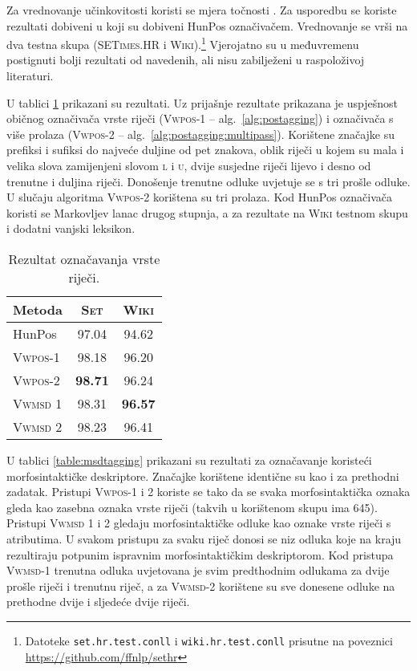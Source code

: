 Za vrednovanje učinkovitosti koristi se mjera točnosti . Za
usporedbu se koriste rezultati dobiveni u \citep{agic2013lemmatization} koji su
dobiveni HunPos označivačem. Vrednovanje se vrši na dva testna skupa
(\textsc{SETimes.HR} i \textsc{Wiki}).\footnote{Datoteke
\texttt{set.hr.test.conll} i \texttt{wiki.hr.test.conll} prisutne na poveznici
\url{https://github.com/ffnlp/sethr}} Vjerojatno su u međuvremenu postignuti
bolji rezultati od navedenih, ali nisu zabilježeni u raspoloživoj literaturi.

U tablici \ref{table:postagging} prikazani su rezultati. Uz prijašnje rezultate
prikazana je uspješnost običnog označivača vrste riječi (\textsc{Vwpos-1} --
alg.~\ref{alg:postagging}) i označivača s više prolaza (\textsc{Vwpos-2} --
alg.~\ref{alg:postagging:multipass}). Korištene značajke su prefiksi i sufiksi
do najveće duljine od pet znakova, oblik riječi u kojem su mala i velika slova
zamijenjeni slovom \textsc{l} i \textsc{u}, dvije susjedne riječi lijevo i desno
od trenutne i duljina riječi. Donošenje trenutne odluke uvjetuje se s tri prošle
odluke. U slučaju algoritma \textsc{Vwpos-2} korištena su tri prolaza. Kod HunPos
označivača koristi se Markovljev lanac drugog stupnja, a za rezultate na
\textsc{Wiki} testnom skupu i dodatni vanjski leksikon.

\begin{table}
\centering
\caption[Rezultat označavanja vrste riječi.]{Rezultat označavanja vrste riječi.}
\label{table:postagging}
\begin{tabular}{|l|c|c|}
\hline
Metoda             & \textsc{Set}   & \textsc{Wiki}  \\ \hline \hline
HunPos             & 97.04          & 94.62          \\
\textsc{Vwpos-1}   & 98.18          & 96.20          \\
\textsc{Vwpos-2}   & \textbf{98.71} & 96.24          \\
\textsc{Vwmsd} 1   & 98.31          & \textbf{96.57} \\
\textsc{Vwmsd} 2   & 98.23          & 96.41          \\ \hline
\end{tabular}
\end{table}

U tablici \ref{table:msdtagging} prikazani su rezultati za označavanje koristeći
morfosintaktičke deskriptore. Značajke korištene identične su kao i za prethodni
zadatak. Pristupi \textsc{Vwpos-1} i \textsc{2} koriste se tako da se svaka
morfosintaktička oznaka gleda kao zasebna oznaka vrste riječi (takvih u
korištenom skupu ima 645). Pristupi \textsc{Vwmsd} 1 i 2 gledaju
morfosintaktičke odluke kao oznake vrste riječi s atributima. U svakom pristupu
za svaku riječ donosi se niz odluka koje na kraju rezultiraju potpunim ispravnim
morfosintaktičkim deskriptorom.  Kod pristupa \textsc{Vwmsd-1} trenutna odluka
uvjetovana je svim predthodnim odlukama za dvije prošle riječi i trenutnu riječ,
a za \textsc{Vwmsd-2} korištene su sve donesene odluke na prethodne dvije i
sljedeće dvije riječi.

